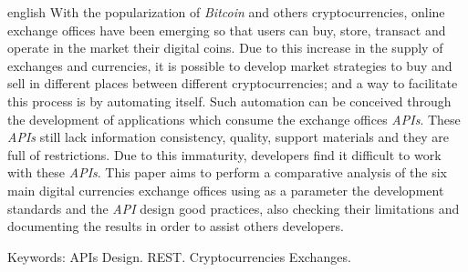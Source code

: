 






\begin{resumo}[Abstract]
	\begin{otherlanguage*}{english}
		With the popularization of \textit{Bitcoin} and others cryptocurrencies, online exchange offices have been emerging so that users can buy, store, transact and operate in the market their digital coins.
Due to this increase in the supply of exchanges and currencies, it is possible to develop market strategies to buy and sell in different places between different cryptocurrencies; and a way to facilitate this process is by automating itself.
Such automation can be conceived through the development of applications which consume the exchange offices \textit{APIs}.
These \textit{APIs} still lack information consistency, quality, support materials and they are full of restrictions. Due to this immaturity, developers find it difficult to work with these \textit{APIs}. 
This paper aims to perform a comparative analysis of the six main digital currencies exchange offices using as a parameter the development standards and the \textit{API} design good practices, also checking their limitations and documenting the results in order to assist others developers.  

   
	  \noindent
	  {Keywords}: APIs Design. REST. Cryptocurrencies Exchanges.
	\end{otherlanguage*}
   \end{resumo}